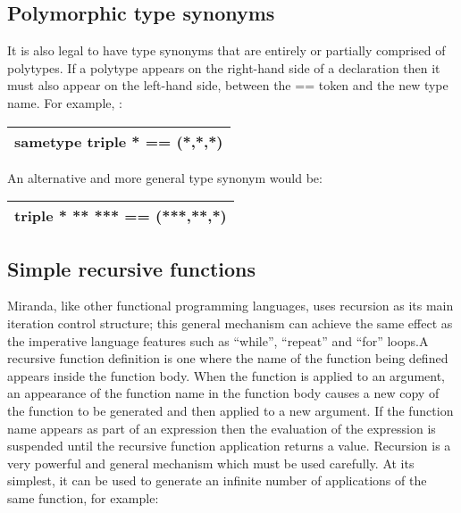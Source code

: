 \documentclass[11pt]{article}
\begin{document}
\subsection{Polymorphic type synonyms}

It is also legal to have type synonyms that are entirely or partially comprised of
polytypes. If a polytype appears on the right-hand side of a declaration then it
must also appear on the left-hand side, between the == token and the new type
name. For example, :




\begin{center}
    \begin{tabular}{|c|}
    \hline
    
    sametype triple * == (*,*,*)\\

\hline
    \end{tabular}
\end{center}
An alternative and more general type synonym would be:




\begin{center}
    \begin{tabular}{|c|}
    \hline
    
triple * ** *** == (***,**,*)\\

\hline
    \end{tabular}
\end{center}



\subsection{Simple recursive functions}

Miranda, like other functional programming languages, uses recursion as its main
iteration control structure; this general mechanism can achieve the same effect as
the imperative language features such as “while”, “repeat” and “for” loops.A
recursive function definition is one where the name of the function being defined
appears inside the function body. When the function is applied to an argument,
an appearance of the function name in the function body causes a new copy of the
function to be generated and then applied to a new argument. If the function name
appears as part of an expression then the evaluation of the expression is suspended
until the recursive function application returns a value.
Recursion is a very powerful and general mechanism which must be used carefully.
At its simplest, it can be used to generate an infinite number of applications
of the same function, for example:
\end{document}
